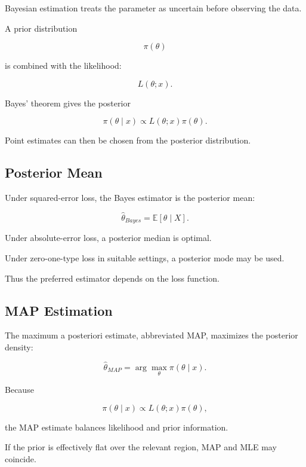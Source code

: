 Bayesian estimation treats the parameter as uncertain before observing
the data.

A prior distribution

\[
\pi(\theta)
\]

is combined with the likelihood:

\[
L(\theta;x).
\]

Bayes' theorem gives the posterior

\[
\boxed{
\pi(\theta\mid x)
\propto
L(\theta;x)\pi(\theta).
}
\]

Point estimates can then be chosen from the posterior distribution.

\subsection{Posterior Mean}
\label{subsec:posterior-mean-estimator}

Under squared-error loss, the Bayes estimator is the posterior mean:

\[
\boxed{
\widehat{\theta}_{Bayes}
=
\mathbb{E}[\theta\mid X].
}
\]

Under absolute-error loss, a posterior median is optimal.

Under zero-one-type loss in suitable settings, a posterior mode may be
used.

Thus the preferred estimator depends on the loss function.

\subsection{MAP Estimation}
\label{subsec:map-estimation}

The maximum a posteriori estimate, abbreviated MAP, maximizes the
posterior density:

\[
\boxed{
\widehat{\theta}_{MAP}
=
\arg\max_\theta
\pi(\theta\mid x).
}
\]

Because

\[
\pi(\theta\mid x)
\propto
L(\theta;x)\pi(\theta),
\]

the MAP estimate balances likelihood and prior information.

If the prior is effectively flat over the relevant region, MAP and MLE
may coincide.


